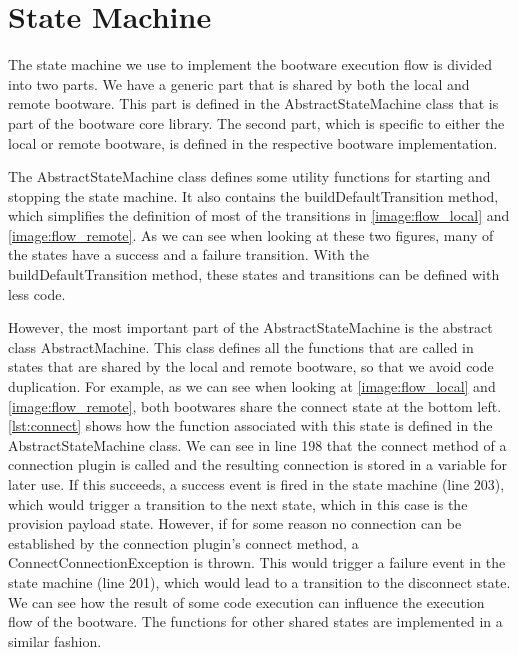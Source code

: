 \section{State Machine}
\label{implementation:statemachine}

The state machine we use to implement the bootware execution flow is divided into two parts.
We have a generic part that is shared by both the local and remote bootware.
This part is defined in the AbstractStateMachine class that is part of the bootware core library.
The second part, which is specific to either the local or remote bootware, is defined in the respective bootware implementation.

The AbstractStateMachine class defines some utility functions for starting and stopping the state machine.
It also contains the buildDefaultTransition method, which simplifies the definition of most of the transitions in \autoref{image:flow_local} and \autoref{image:flow_remote}.
As we can see when looking at these two figures, many of the states have a success and a failure transition.
With the buildDefaultTransition method, these states and transitions can be defined with less code.

However, the most important part of the AbstractStateMachine is the abstract class AbstractMachine.
This class defines all the functions that are called in states that are shared by the local and remote bootware, so that we avoid code duplication.
For example, as we can see when looking at \autoref{image:flow_local} and \autoref{image:flow_remote}, both bootwares share the connect state at the bottom left.
\autoref{lst:connect} shows how the function associated with this state is defined in the AbstractStateMachine class.
We can see in line 198 that the connect method of a connection plugin is called and the resulting connection is stored in a variable for later use.
If this succeeds, a success event is fired in the state machine (line 203), which would trigger a transition to the next state, which in this case is the provision payload state.
However, if for some reason no connection can be established by the connection plugin's connect method, a ConnectConnectionException is thrown.
This would trigger a failure event in the state machine (line 201), which would lead to a transition to the disconnect state.
We can see how the result of some code execution can influence the execution flow of the bootware.
The functions for other shared states are implemented in a similar fashion.

\vspace*{\baselineskip}

